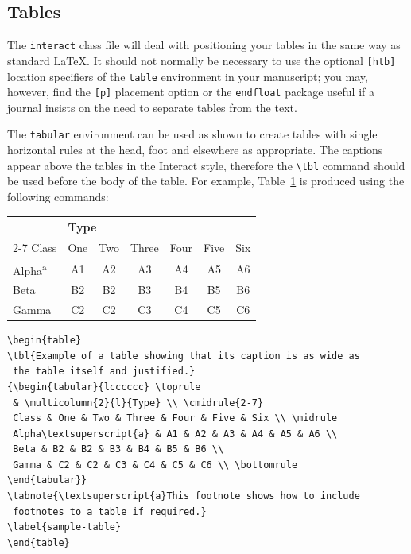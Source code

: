 \documentclass[]{interact}
\theoremstyle{plain}%
\theoremstyle{definition}
\theoremstyle{remark}
\begin{document}
\subsection{Tables}

The \texttt{interact} class file will deal with positioning your tables in the same way as standard \LaTeX. It should not normally be necessary to use the optional \texttt{[htb]} location specifiers of the \texttt{table} environment in your manuscript; you may, however, find the \verb"[p]" placement option or the \verb"endfloat" package useful if a journal insists on the need to separate tables from the text.

The \texttt{tabular} environment can be used as shown to create tables with single horizontal rules at the head, foot and elsewhere as appropriate. The captions appear above the tables in the \textsf{Interact} style, therefore the \verb"\tbl" command should be used before the body of the table. For example, Table~\ref{sample-table} is produced using the following commands:

\begin{table}
{\begin{tabular}{lcccccc} \toprule
 & \multicolumn{2}{l}{Type} \\ \cmidrule{2-7}
 Class & One & Two & Three & Four & Five & Six \\ \midrule
 Alpha\textsuperscript{a} & A1 & A2 & A3 & A4 & A5 & A6 \\
 Beta & B2 & B2 & B3 & B4 & B5 & B6 \\
 Gamma & C2 & C2 & C3 & C4 & C5 & C6 \\ \bottomrule
\end{tabular}}
\label{sample-table}
\end{table}

\begin{verbatim}
\begin{table}
\tbl{Example of a table showing that its caption is as wide as
 the table itself and justified.}
{\begin{tabular}{lcccccc} \toprule
 & \multicolumn{2}{l}{Type} \\ \cmidrule{2-7}
 Class & One & Two & Three & Four & Five & Six \\ \midrule
 Alpha\textsuperscript{a} & A1 & A2 & A3 & A4 & A5 & A6 \\
 Beta & B2 & B2 & B3 & B4 & B5 & B6 \\
 Gamma & C2 & C2 & C3 & C4 & C5 & C6 \\ \bottomrule
\end{tabular}}
\tabnote{\textsuperscript{a}This footnote shows how to include
 footnotes to a table if required.}
\label{sample-table}
\end{table}
\end{verbatim}
\end{document}
